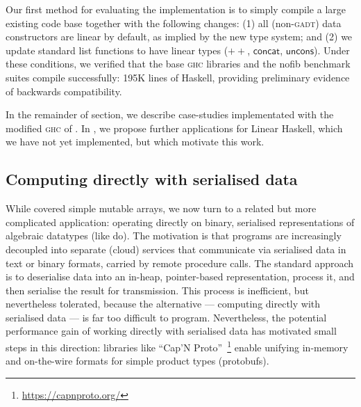 \documentclass[acmsmall,screen]{acmart}\settopmatter{}
\newcommand{\Varid}[1]{\mathit{#1}}
\newcommand{\plus}{\mathbin{+\!\!\!+}}
\renewcommand\Varid[1]{\mathord{\textsf{#1}}}
\newcommand{\ghc}{\textsc{ghc}\xspace}
\newcommand\HaskeLL{Linear Haskell\xspace{}}
\begin{document}
Our first method for evaluating the implementation is to simply compile a large
existing code base together with the following changes: (1) all
(non-\textsc{gadt}) data constructors are
linear by default, as implied by the new type system; and (2) we update standard
list functions to have linear types (\ensuremath{\plus }, \ensuremath{\Varid{concat}}, \ensuremath{\Varid{uncons}}).
%
Under these conditions, we verified that the base \textsc{ghc} libraries and the nofib
benchmark suites compile successfully: 195K lines of Haskell, providing
preliminary evidence of backwards compatibility.

In the remainder of section, we describe case-studies implementated with the modified
\ghc  of .
%
In , we propose further applications for \HaskeLL, which we
have not yet implemented, but which motivate this work.


\subsection{Computing directly with serialised data}
\label{sec:cursors}

While  covered simple mutable arrays, we now
turn to a related but more complicated application: operating directly on binary,
serialised representations of algebraic datatypes
(like \citet{vollmer_gibbon_2017} do).
The motivation is that programs are increasingly decoupled into separate (cloud)
services that communicate via serialised data in text or binary formats, carried
by remote procedure calls.
%
The standard approach is to deserialise data into an in-heap, pointer-based representation,
process it, and then serialise the result for transmission.
%
This process is inefficient, but nevertheless tolerated, because the alternative
--- computing directly with serialised data --- is far too difficult to program.
%
Nevertheless, the potential performance gain of working directly with serialised
data has motivated small steps in this direction:
%
libraries like ``Cap'N Proto''~\footnote{{\url{https://capnproto.org/}}} enable unifying
in-memory and on-the-wire formats for simple product types (protobufs).
\end{document}
